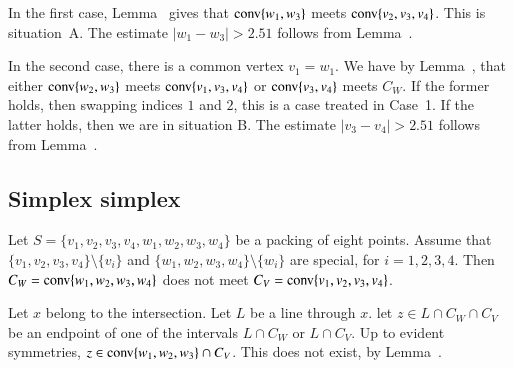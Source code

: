 \begin{tarskidata}
\begin{tarski}
\begin{proved}
In the first case, Lemma~ gives that ${\operatorname{conv}}\{w_1,w_3\}$
meets ${\operatorname{conv}}\{v_2,v_3,v_4\}$.  This is situation~A.  The estimate
$|w_1-w_3|>2.51$ follows from Lemma~.\FIXX{$\CalE$}

In the second case, there is a common vertex $v_1=w_1$.  We have
by Lemma~, that either ${\operatorname{conv}}\{w_2,w_3\}$ meets
${\operatorname{conv}}\{v_1,v_3,v_4\}$ or ${\operatorname{conv}}\{v_3,v_4\}$ meets
$C_W$.  If the former holds, then swapping indices $1$ and $2$,
this is a case treated in Case~1.  If the latter holds, then
we are in situation B.  The estimate $|v_3-v_4|>2.51$ follows
from Lemma~.\FIXX{$\CalE$}
\swallowed\end{proved}
\end{tarski}







\begin{tarski}
\section{Simplex simplex}

\begin{lemma}
Let $S=\{v_1,v_2,v_3,v_4,w_1,w_2,w_3,w_4\}$ be a packing of eight
points.
Assume that $\{v_1,v_2,v_3,v_4\}\setminus\{v_i\}$ and
$\{w_1,w_2,w_3,w_4\}\setminus\{w_i\}$ are special, for $i=1,2,3,4$.
Then $C_W ={\operatorname{conv}}\{w_1,w_2,w_3,w_4\}$ does not meet
$C_V = {\operatorname{conv}}\{v_1,v_2,v_3,v_4\}$.
\end{lemma}

\begin{proved}
Let $x$ belong to the intersection.  Let $L$ be a line through
$x$.  let $z\in L\cap C_W\cap C_V$ be an endpoint of one of the
intervals $L\cap C_W$ or $L\cap C_V$.  Up to evident symmetries,
$z\in {\operatorname{conv}}\{w_1,w_2,w_3\}\cap C_V$.  This does not exist,
by Lemma~.
\swallowed\end{proved}
\end{tarski}





\begin{tarski}


\end{tarski}
\end{tarskidata}
